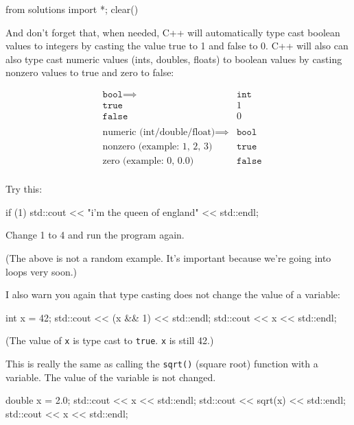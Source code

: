 \begin{python0}
from solutions import *; clear()
\end{python0}

And don't forget that, when needed, C++ will
automatically type cast boolean values to integers by casting the value
true to 1 and false to 0. C++ will also can also type cast numeric
values (ints, doubles, floats) to boolean values by casting nonzero
values to true and zero to false:

\begin{align*}
&\texttt{bool} \implies &\texttt{int}\\
&\texttt{true} &1\\
&\texttt{false} &0\\\\
&\text{numeric (int/double/float)} \implies &\texttt{bool}\\
&\text{nonzero (example: 1, 2, 3)} &\texttt{true}\\
&\text{zero (example: 0, 0.0)} &\texttt{false}\\
\end{align*}

Try this:\\
\begin{console}
if (1)
std::cout << "i'm the queen of england"
          << std::endl; 
\end{console}

Change 1 to 4 and run the program again.

(The above is not a random example. It's important
because we're going into loops very soon.)


I also warn you again that type casting does not change the value of a
variable:\\
\begin{console}
int x = 42;
std::cout << (x && 1) << std::endl;
std::cout << x << std::endl; 
\end{console}

(The value of \texttt{x} is type cast to \texttt{true}. \texttt{x} is still 42.)

This is really the same as calling the \texttt{sqrt()} (square root) function with a variable. The value of the variable is not changed.
\begin{console}
double x = 2.0;
std::cout << x << std::endl;
std::cout << sqrt(x) << std::endl;
std::cout << x << std::endl; 
\end{console}
